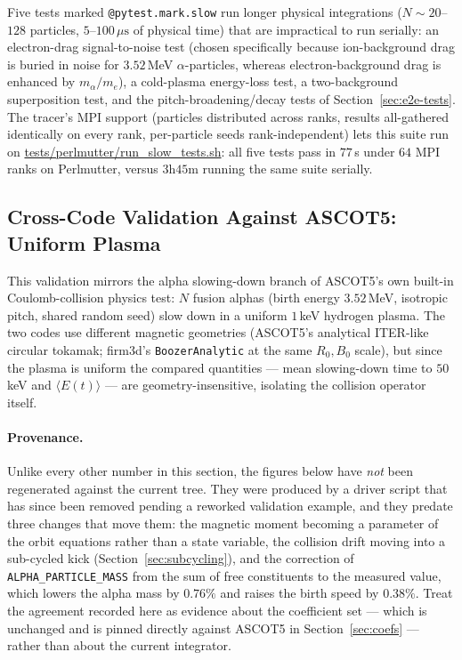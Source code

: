 \documentclass[11pt]{article}
\begin{document}
Five tests marked \texttt{@pytest.mark.slow} run longer physical
integrations ($N\sim20$--$128$ particles, $5$--$100\,\mu\mathrm{s}$ of
physical time) that are impractical to run serially: an electron-drag
signal-to-noise test (chosen specifically because ion-background drag is
buried in noise for $3.52$\,MeV $\alpha$-particles, whereas electron-background
drag is enhanced by $m_\alpha/m_e$), a cold-plasma energy-loss test, a
two-background superposition test, and the pitch-broadening/decay tests of
Section~\ref{sec:e2e-tests}.  The tracer's MPI support (particles
distributed across ranks, results all-gathered identically on every rank,
per-particle seeds rank-independent) lets this suite run on
\url{tests/perlmutter/run_slow_tests.sh}: all five tests pass in
$77$\,s under $64$ MPI ranks on Perlmutter, versus $3\mathrm{h}45\mathrm{m}$
running the same suite serially.

\subsection{Cross-Code Validation Against ASCOT5: Uniform Plasma}
\label{sec:ascot5-uniform}

This validation mirrors the alpha slowing-down branch of ASCOT5's own
built-in Coulomb-collision physics
test: $N$ fusion alphas (birth energy $3.52$\,MeV, isotropic pitch, shared
random seed) slow down in a uniform $1$\,keV hydrogen plasma.  The two
codes use different magnetic geometries (ASCOT5's analytical ITER-like
circular tokamak; firm3d's \texttt{BoozerAnalytic} at the same $R_0,B_0$
scale), but since the plasma is uniform the compared quantities ---
mean slowing-down time to $50$\,keV and $\langle E(t)\rangle$ --- are
geometry-insensitive, isolating the collision operator itself.

\paragraph{Provenance.}  Unlike every other number in this section, the
figures below have \emph{not} been regenerated against the current tree.
They were produced by a driver script that has since been removed pending a
reworked validation example, and they predate three changes that move them:
the magnetic moment becoming a parameter of the orbit equations rather than a
state variable, the collision drift moving into a sub-cycled kick
(Section~\ref{sec:subcycling}), and the correction of
\texttt{ALPHA\_PARTICLE\_MASS} from the sum of free constituents to the
measured value, which lowers the alpha mass by $0.76\%$ and raises the birth
speed by $0.38\%$.  Treat the agreement recorded here as evidence about the
coefficient set --- which is unchanged and is pinned directly against ASCOT5
in Section~\ref{sec:coefs} --- rather than about the current integrator.
\end{document}
